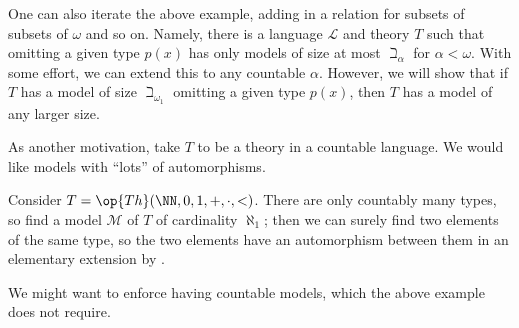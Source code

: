 \documentclass[../notes.tex]{subfiles}
\begin{document}
One can also iterate the above example, adding in a relation for subsets of subsets of $\omega$ and so on. Namely, there is a language $\mathcal L$ and theory $T$ such that omitting a given type $p(x)$ has only models of size at most $\beth_\alpha$ for $\alpha<\omega$. With some effort, we can extend this to any countable $\alpha$. However, we will show that if $T$ has a model of size $\beth_{\omega_1}$ omitting a given type $p(x)$, then $T$ has a model of any larger size.

As another motivation, take $T$ to be a theory in a countable language. We would like models with ``lots'' of automorphisms.
\begin{example}
	Consider $T=\op{Th}(\NN,0,1,+,\cdot,<)$. There are only countably many types, so find a model $\mathcal M$ of $T$ of cardinality $\aleph_1$; then we can surely find two elements of the same type, so the two elements have an automorphism between them in an elementary extension by .
\end{example}
We might want to enforce having countable models, which the above example does not require.
\end{document}
